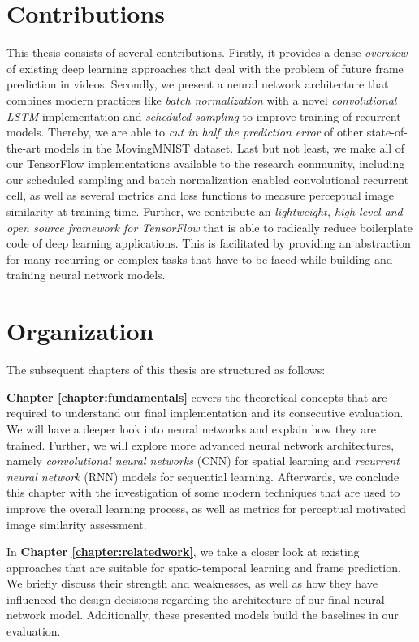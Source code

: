 \section{Contributions}

This thesis consists of several contributions. Firstly, it provides a dense \textit{overview} of existing deep learning approaches that deal with the problem of future frame prediction in videos. Secondly, we present a neural network architecture that combines modern practices like \textit{batch normalization} with a novel \textit{convolutional LSTM} implementation and \textit{scheduled sampling} to improve training of recurrent models. Thereby, we are able to \textit{cut in half the prediction error} of other state-of-the-art models in the MovingMNIST dataset. Last but not least, we make all of our TensorFlow implementations available to the research community, including our scheduled sampling and batch normalization enabled convolutional recurrent cell, as well as several metrics and loss functions to measure perceptual image similarity at training time. Further, we contribute an \textit{lightweight, high-level and open source framework for TensorFlow} that is able to radically reduce boilerplate code of deep learning applications. This is facilitated by providing an abstraction for many recurring or complex tasks that have to be faced while building and training neural network models.


\section{Organization}

The subsequent chapters of this thesis are structured as follows:

\textbf{Chapter \ref{chapter:fundamentals}} covers the theoretical concepts that are required to understand our final implementation and its consecutive evaluation. We will have a deeper look into neural networks and explain how they are trained. Further, we will explore more advanced neural network architectures, namely \textit{convolutional neural networks} (CNN) for spatial learning and \textit{recurrent neural network} (RNN) models for sequential learning. Afterwards, we conclude this chapter with the investigation of some modern techniques that are used to improve the overall learning process, as well as metrics for perceptual motivated image similarity assessment.

In \textbf{Chapter \ref{chapter:relatedwork}}, we take a closer look at existing approaches that are suitable for spatio-temporal learning and frame prediction. We briefly discuss their strength and weaknesses, as well as how they have influenced the design decisions regarding the architecture of our final neural network model. Additionally, these presented models build the baselines in our evaluation.


